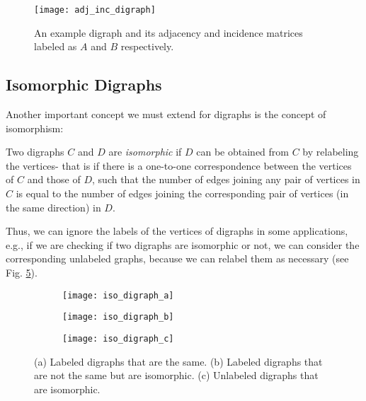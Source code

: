 \begin{figure}[h]
\centering
\texttt{[image: adj\_inc\_digraph]}
\caption[Adjacency and incidence matrices for a digraph.]{An example digraph and its adjacency and incidence matrices labeled as $A$ and $B$ respectively.}
\label{fig:adj_inc_digraph}
\end{figure}

\subsection{Isomorphic Digraphs}
Another important concept we must extend for digraphs is the concept of isomorphism:

\begin{defn}
	Two digraphs $C$ and $D$ are \textit{isomorphic} if $D$ can be obtained from $C$ by relabeling the vertices- that is if there is a one-to-one correspondence between the vertices of $C$ and those of $D$, such that the number of edges joining any pair of vertices in $C$ is equal to the number of edges joining the corresponding pair of vertices (in the same direction) in $D$.
\end{defn}

Thus, we can ignore the labels of the vertices of digraphs in some applications, e.g., if we are checking if two digraphs are isomorphic or not, we can consider the corresponding unlabeled graphs, because we can relabel them as necessary (see Fig. \ref{fig:isomorphic_digraphs}).\\

\begin{figure}
	\centering
	\begin{subfigure}[b]{0.9\textwidth}
		\centering
		\texttt{[image: iso\_digraph\_a]}
		\caption{}
		\label{fig:isodi1}
	\end{subfigure}
	\hfill
	\begin{subfigure}[b]{0.9\textwidth}
		\centering
		\texttt{[image: iso\_digraph\_b]}
		\caption{}
		\label{fig:isodi2}
	\end{subfigure}
	\begin{subfigure}[b]{0.9\textwidth}
		\centering
		\texttt{[image: iso\_digraph\_c]}
		\caption{}
		\label{fig:isodi3}
	\end{subfigure}
	\caption[Isomorphic digraphs.]{(a) Labeled digraphs that are the same. (b) Labeled digraphs that are not the same but are isomorphic. (c) Unlabeled digraphs that are isomorphic.}
	\label{fig:isomorphic_digraphs}
\end{figure}


